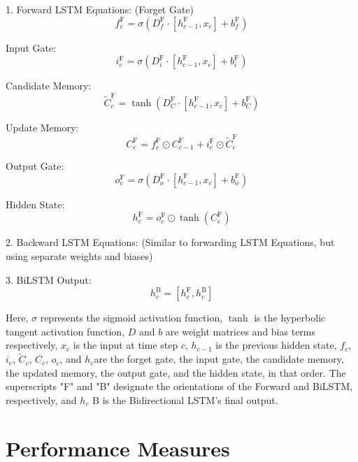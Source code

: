 1. Forward LSTM Equations:
(Forget Gate)
\begin{equation}
f_c^{\text{F}} = \sigma(D_f^{\text{F}} \cdot [h_{c-1}^{\text{F}}, x_c] + b_f^{\text{F}})
\end{equation}

Input Gate:
\begin{equation}
i_c^{\text{F}} = \sigma(D_i^{\text{F}} \cdot [h_{c-1}^{\text{F}}, x_c] + b_i^{\text{F}})
\end{equation}

Candidate Memory:
\begin{equation}
\tilde{C}_c^{\text{F}} = \tanh(D_C^{\text{F}} \cdot [h_{c-1}^{\text{F}}, x_c] + b_C^{\text{F}})
\end{equation}

Update Memory:
\begin{equation}
C_c^{\text{F}} = f_c^{\text{F}} \odot C_{c-1}^{\text{F}} + i_c^{\text{F}} \odot \tilde{C}_c^{\text{F}}
\end{equation}

Output Gate:
\begin{equation}
o_c^{\text{F}} = \sigma(D_o^{\text{F}} \cdot [h_{c-1}^{\text{F}}, x_c] + b_o^{\text{F}})
\end{equation}

Hidden State:
\begin{equation}
h_c^{\text{F}} = o_c^{\text{F}} \odot \tanh(C_c^{\text{F}})
\end{equation}

2. Backward LSTM Equations:
(Similar to forwarding LSTM Equations, but using separate weights and biases)

3. BiLSTM Output:
\begin{equation}
h_c^{\text{B}} = [h_c^{\text{F}}, h_c^{\text{B}}]
\end{equation}

Here, $\sigma$ represents the sigmoid activation function, $\tanh$ is the hyperbolic tangent activation function, $D$ and $b$ are weight matrices and bias terms respectively, $x_c$ is the input at time step $c$, $h_{c-1}$ is the previous hidden state, $f_c$, $i_c$, $\tilde{C}_c$, $C_c$, $o_c$, and $h_c$are the forget gate, the input gate, the candidate memory, the updated memory, the output gate, and the hidden state, in that order. The superscripts "F" and "B" designate the orientations of the Forward and BiLSTM, respectively, and $h_c\text{ B}$ is the Bidirectional LSTM's final output.


\section{Performance Measures}
